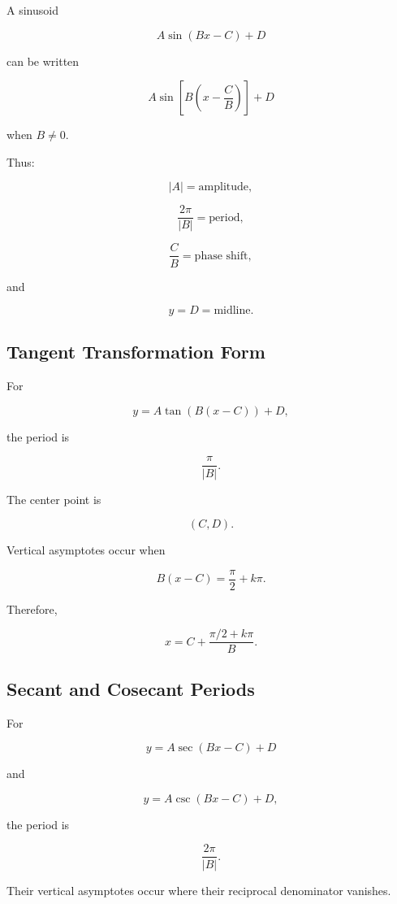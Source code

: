 A sinusoid

\[
A\sin(Bx-C)+D
\]

can be written

\[
\boxed{
A
\sin
\left[
B
\left(
x-\frac{C}{B}
\right)
\right]
+
D
}
\]

when \(B\neq0\).

Thus:

\[
\boxed{
|A|
=
\text{amplitude},
}
\]

\[
\boxed{
\frac{2\pi}{|B|}
=
\text{period},
}
\]

\[
\boxed{
\frac{C}{B}
=
\text{phase shift},
}
\]

and

\[
\boxed{
y=D
=
\text{midline}.
}
\]

\subsection{Tangent Transformation Form}
\label{subsec:tangent-transformation-reference}

For

\[
\boxed{
y
=
A\tan(B(x-C))+D,
}
\]

the period is

\[
\boxed{
\frac{\pi}{|B|}.
}
\]

The center point is

\[
\boxed{
(C,D).
}
\]

Vertical asymptotes occur when

\[
B(x-C)
=
\frac{\pi}{2}
+
k\pi.
\]

Therefore,

\[
\boxed{
x
=
C
+
\frac{
\pi/2+k\pi
}{
B
}.
}
\]

\subsection{Secant and Cosecant Periods}
\label{subsec:sec-csc-periods}

For

\[
y=A\sec(Bx-C)+D
\]

and

\[
y=A\csc(Bx-C)+D,
\]

the period is

\[
\boxed{
\frac{2\pi}{|B|}.
}
\]

Their vertical asymptotes occur where their reciprocal denominator vanishes.


